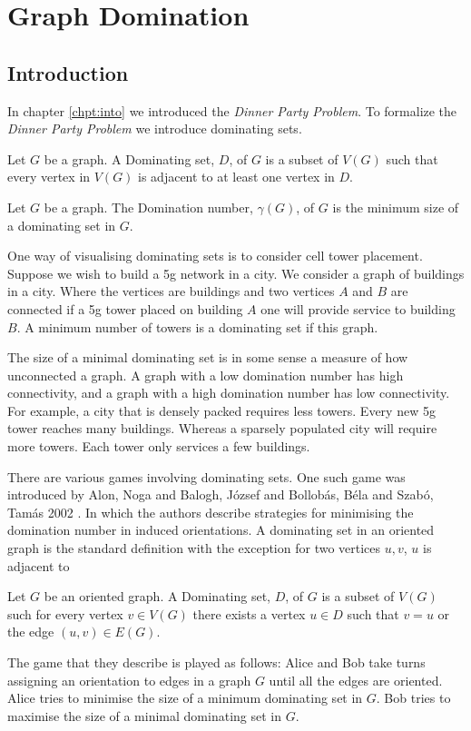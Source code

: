\chapter{Graph Domination}\label{chpt:domSet}

\section{Introduction}

In chapter \ref{chpt:into} we introduced the \textit{Dinner Party Problem}. To formalize the \textit{Dinner Party Problem} we introduce dominating sets. 

\begin{definition}
    Let $G$ be a graph. A Dominating set, $D$, of $G$ is a subset of $V(G)$ such that every vertex in $V(G)$ is adjacent to at least one vertex in $D$.
\end{definition} 
\begin{definition}
    Let $G$ be a graph. The Domination number, $\gamma(G)$, of $G$ is the minimum size of a dominating set in $G$.
\end{definition}

One way of visualising dominating sets is to consider cell tower placement. Suppose we wish to build a 5g network in a city. We consider a graph of buildings in a city. Where the vertices are buildings and two vertices $A$ and $B$ are connected if a 5g tower placed on building $A$ one will provide service to building $B$. A minimum number of towers is a dominating set if this graph.

The size of a minimal dominating set is in some sense a measure of how unconnected a graph. A graph with a low domination number has high connectivity, and a graph with a high domination number has low connectivity. For example, a city that is densely packed requires less towers. Every new 5g tower reaches many buildings. Whereas a sparsely populated city will require more towers. Each tower only services a few buildings.   

There are various games involving dominating sets. One such game was introduced by  Alon, Noga and Balogh, J\'{o}zsef and Bollob\'{a}s, B\'{e}la and Szab\'{o}, Tam\'{a}s 2002 \cite{AlBABoSz2002}. In which the authors describe strategies for minimising the domination number in induced orientations. A dominating set in an oriented graph is the standard definition with the exception for two vertices $u,v$, $u$ is adjacent to  
\begin{definition}
    Let $G$ be an oriented graph.  A Dominating set, $D$, of $G$ is a subset of $V(G)$ such for every vertex $v\in V(G)$ there exists a vertex $u\in D$ such that $v=u$ or the edge $(u,v)\in E(G)$. 
\end{definition}
The game that they describe is played as follows: Alice and Bob take turns assigning an orientation to edges in a graph $G$ until all the edges are oriented. Alice tries to minimise the size of a minimum dominating set in $G$. Bob tries to maximise the size of a minimal dominating set in $G$.     

